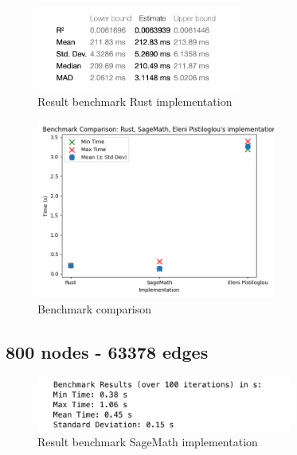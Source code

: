 \begin{figure}[!h]
    \centering
    \includegraphics[width=0.60\textwidth]{images/benchmark/graph_500_24864/benchmark_graph_500_24864_rust}
    \caption{Result benchmark Rust implementation}
    \label{fig:benchmark-graph-500-24864-rust}
\end{figure}

\begin{figure}[!h]
    \centering
    \includegraphics[width=0.70\textwidth]{images/benchmark/graph_500_24864/benchmark_comparison_graph_500_24864}
    \caption{Benchmark comparison}
    \label{fig:benchmark-comparison-graph-500-24864}
\end{figure}


\newpage


\subsection{800 nodes - 63378 edges}\label{subsec:result-for-graphs-800-63378}

\begin{figure}[!h]
    \centering
    \includegraphics[width=0.75\textwidth]{images/benchmark/graph_800_63378/benchmark_graph_800_63378_sagemath}
    \caption{Result benchmark SageMath implementation}
    \label{fig:benchmark-graph-800-63378-sagemath}
\end{figure}

